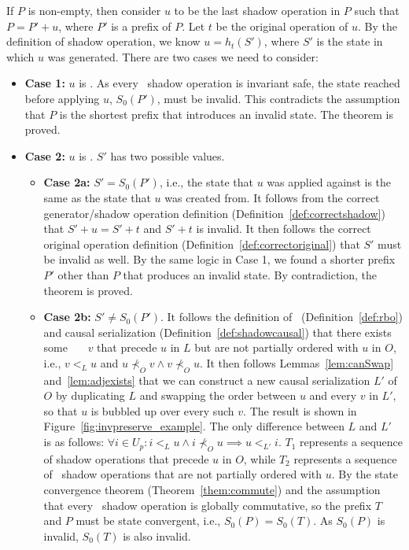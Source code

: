 If $P$ is non-empty, then consider $u$ to be the last shadow operation in $P$ such that
$P=P'+u$, where $P'$ is a prefix of $P$. Let $t$ be the original operation of $u$. By the definition of 
shadow operation, we know $u=h_t(S')$, where $S'$ is the state in which $u$ was
generated. There are two cases we need to consider:
\begin{itemize}
\item {\bf Case 1:} $u$ is \blue. As every \blue\ shadow operation is invariant safe, 
the state reached before applying $u$, $S_0(P')$, must be invalid. This contradicts
the assumption that $P$ is the shortest prefix that introduces an invalid state. The theorem
is proved.

\item {\bf Case 2:} $u$ is \red. $S'$ has two possible values.
\begin{itemize}
\item {\bf Case 2a:} $S' = S_0(P')$, i.e., the state that $u$ was applied against
is the same as the state that $u$ was created from. It follows from
the correct generator/shadow operation definition (Definition~\ref{def:correctshadow})
that $S' + u = S' + t$ and $S' + t$ is invalid. 
It then follows the correct original operation definition (Definition~\ref{def:correctoriginal})
 that $S'$ must be invalid as well. By the same
logic in Case 1, we found a shorter prefix $P'$ other than $P$ that
produces an invalid state. By contradiction, the theorem is proved.

\item {\bf Case 2b:} $S' \neq S_0(P')$. It follows the definition of \RBo\ (Definition~\ref{def:rbo}) and
causal serialization (Definition~\ref{def:shadowcausal}) that there exists some \blue\ \shadow\ \transactions\ $v$
that precede $u$ in $L$ but are not partially ordered with $u$ in $O$, 
i.e., $v<_Lu$ and $u\not\prec_{O} v\wedge v\not\prec_{O} u$. It then follows 
Lemmas~\ref{lem:canSwap} and~\ref{lem:adjexists} that we can
construct a new causal serialization $L'$ of $O$ by duplicating $L$ and
swapping the order between $u$ and every $v$ in $L'$, so that $u$ is bubbled up
over every such $v$. The result is shown in Figure~\ref{fig:invpreserve_example}.
The only difference between $L$ and $L'$ is as follows:
$\forall i \in U_{p}: i<_L u \wedge i\not\prec_{O} u \implies u<_{L'} i$. 
$T_1$ represents a sequence of shadow operations that precede $u$
in $O$, while $T_2$ represents a sequence of \blue\ shadow operations
that are not partially ordered with $u$.
By the state convergence theorem (Theorem~\ref{them:commute}) and the assumption that
every \blue\ shadow operation is globally commutative, so the prefix $T$ and $P$ must be state convergent, 
i.e., $S_0(P) = S_0(T)$. As $S_0(P)$ is invalid, $S_0(T)$ is also invalid. 


\end{itemize}
\end{itemize}
